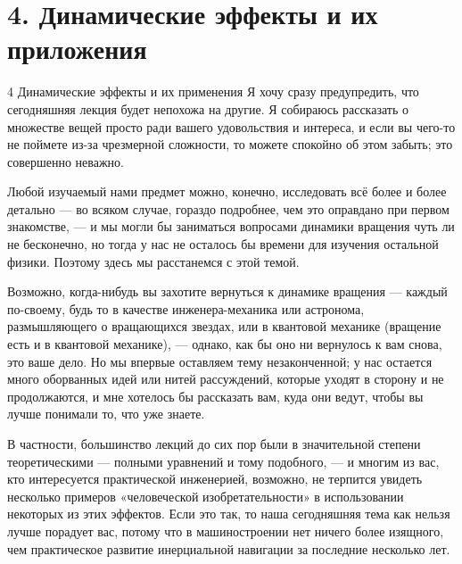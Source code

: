 \documentclass[10pt,oneside]{article}
\begin{document}
\section*{4. Динамические эффекты и их приложения}
\label{tips-sec-12-4-динамические-эффекты-и-их-приложения}
4 Динамические эффекты и их применения Я хочу сразу предупредить, что сегодняшняя лекция будет непохожа на другие. Я собираюсь рассказать о множестве вещей просто ради вашего удовольствия и интереса, и если вы чего-то не поймете из-за чрезмерной сложности, то можете спокойно об этом забыть; это совершенно неважно.\par

Любой изучаемый нами предмет можно, конечно, исследовать всё более и более детально --- во всяком случае, гораздо подробнее, чем это оправдано при первом знакомстве, --- и мы могли бы заниматься вопросами динамики вращения чуть ли не бесконечно, но тогда у нас не осталось бы времени для изучения остальной физики. Поэтому здесь мы расстанемся с этой темой.\par

Возможно, когда-нибудь вы захотите вернуться к динамике вращения --- каждый по-своему, будь то в качестве инженера-механика или астронома, размышляющего о вращающихся звездах, или в квантовой механике (вращение есть и в квантовой механике), --- однако, как бы оно ни вернулось к вам снова, это ваше дело. Но мы впервые оставляем тему незаконченной; у нас остается много оборванных идей или нитей рассуждений, которые уходят в сторону и не продолжаются, и мне хотелось бы рассказать вам, куда они ведут, чтобы вы лучше понимали то, что уже знаете.\par

В частности, большинство лекций до сих пор были в значительной степени теоретическими --- полными уравнений и тому подобного, --- и многим из вас, кто интересуется практической инженерией, возможно, не терпится увидеть несколько примеров «человеческой изобретательности» в использовании некоторых из этих эффектов. Если это так, то наша сегодняшняя тема как нельзя лучше порадует вас, потому что в машиностроении нет ничего более изящного, чем практическое развитие инерциальной навигации за последние несколько лет.\par
\end{document}
